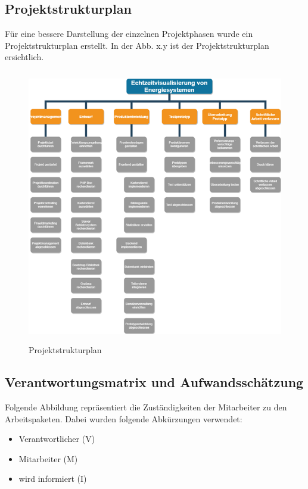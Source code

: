 \subsection{Projektstrukturplan}
Für eine bessere Darstellung der einzelnen Projektphasen wurde ein Projektstrukturplan erstellt. In der Abb. x.y ist der Projektstrukturplan ersichtlich.
\begin{figure}[h]
	\centering
	\includegraphics[height=12cm,width=12cm]{images/Projektstrukturplan}
	\caption{Projektstrukturplan}
	\label{fig:Projektstrukturplan }
\end{figure} 



\subsection{Verantwortungsmatrix und Aufwandsschätzung}
Folgende Abbildung repräsentiert die Zuständigkeiten der Mitarbeiter zu den Arbeitspaketen.
Dabei wurden folgende Abkürzungen verwendet:
\begin{itemize}
	\item  Verantwortlicher (V)
	\item Mitarbeiter (M)
	\item wird informiert (I)
\end{itemize}

